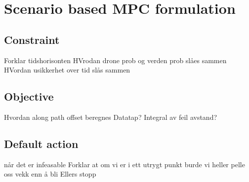 \section{Scenario based MPC formulation}
\subsection{Constraint}
Forklar tidshorisonten
        HVrodan drone prob og verden prob slåes sammen
        HVordan usikkerhet over tid slås sammen

\subsection{Objective}
        Hvordan along path offset beregnes
        Datatap? Integral av feil avstand?
        
\subsection{Default action}
når det er infeasable
        Forklar at om vi er i ett utrygt punkt burde vi heller pelle oss vekk enn å bli
        Ellers stopp